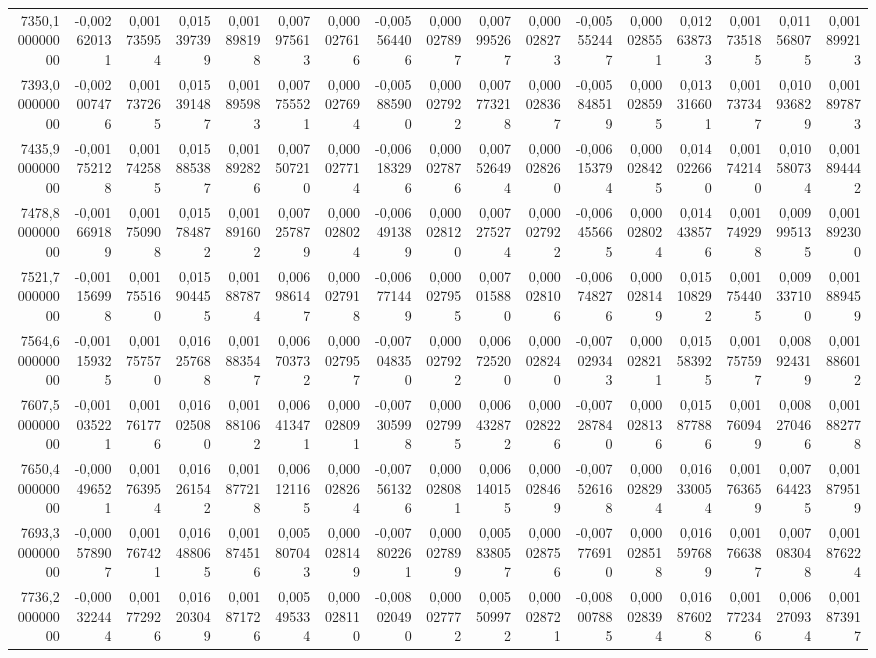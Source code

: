 \begin{longtable}{rrrrrrrrrrrrrrrrr}
7350,100000000 & -0,002620131 & 0,001735954 & 0,015397399 & 0,001898198 & 0,007975613 & 0,000027616 & -0,005564406 & 0,000027897 & 0,007995267 & 0,000028273 & -0,005552447 & 0,000028551 & 0,012638733 & 0,001735185 & 0,011568075 & 0,001899213\\
7393,000000000 & -0,002007476 & 0,001737265 & 0,015391487 & 0,001895983 & 0,007755521 & 0,000027694 & -0,005885900 & 0,000027922 & 0,007773218 & 0,000028367 & -0,005848519 & 0,000028595 & 0,013316601 & 0,001737347 & 0,010936829 & 0,001897873\\
7435,900000000 & -0,001752128 & 0,001742585 & 0,015885387 & 0,001892826 & 0,007507210 & 0,000027714 & -0,006183296 & 0,000027876 & 0,007526494 & 0,000028260 & -0,006153794 & 0,000028425 & 0,014022660 & 0,001742140 & 0,010580734 & 0,001894442\\
7478,800000000 & -0,001669189 & 0,001750908 & 0,015784872 & 0,001891602 & 0,007257879 & 0,000028024 & -0,006491389 & 0,000028120 & 0,007275274 & 0,000027922 & -0,006455665 & 0,000028024 & 0,014438576 & 0,001749298 & 0,009995135 & 0,001892300\\
7521,700000000 & -0,001156998 & 0,001755160 & 0,015904455 & 0,001887874 & 0,006986147 & 0,000027918 & -0,006771449 & 0,000027955 & 0,007015880 & 0,000028106 & -0,006748276 & 0,000028149 & 0,015108292 & 0,001754405 & 0,009337100 & 0,001889459\\
7564,600000000 & -0,001159325 & 0,001757570 & 0,016257688 & 0,001883547 & 0,006703732 & 0,000027957 & -0,007048350 & 0,000027922 & 0,006725200 & 0,000028240 & -0,007029343 & 0,000028211 & 0,015583925 & 0,001757597 & 0,008924319 & 0,001886012\\
7607,500000000 & -0,001035221 & 0,001761776 & 0,016025080 & 0,001881062 & 0,006413471 & 0,000028091 & -0,007305998 & 0,000027995 & 0,006432872 & 0,000028226 & -0,007287840 & 0,000028136 & 0,015877886 & 0,001760949 & 0,008270466 & 0,001882778\\
7650,400000000 & -0,000496521 & 0,001763954 & 0,016261542 & 0,001877218 & 0,006121165 & 0,000028264 & -0,007561326 & 0,000028081 & 0,006140155 & 0,000028469 & -0,007526168 & 0,000028294 & 0,016330054 & 0,001763659 & 0,007644235 & 0,001879519\\
7693,300000000 & -0,000578907 & 0,001767421 & 0,016488065 & 0,001874516 & 0,005807043 & 0,000028149 & -0,007802261 & 0,000027899 & 0,005838057 & 0,000028756 & -0,007776910 & 0,000028518 & 0,016597689 & 0,001766387 & 0,007083048 & 0,001876224\\
7736,200000000 & -0,000322444 & 0,001772926 & 0,016203049 & 0,001871726 & 0,005495334 & 0,000028110 & -0,008020490 & 0,000027772 & 0,005509972 & 0,000028721 & -0,008007885 & 0,000028394 & 0,016876028 & 0,001772346 & 0,006270934 & 0,001873917\\

\end{longtable}
